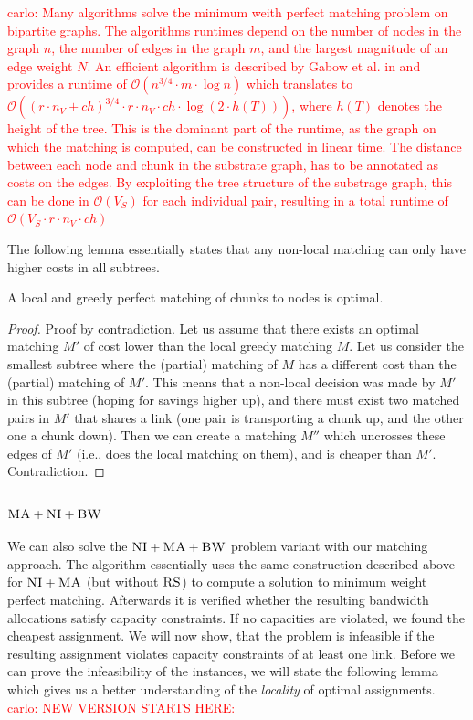 \documentclass[9pt]{sigcomm-alternate}
\newcommand{\carlo}[1]{\textcolor{red}{carlo: #1}}
\newcommand{\MaFactor}{r}
\newcommand{\SubstrateNodes}{\ensuremath{V_S}}
\newcommand{\CC}{\textsc{NI}}
\newcommand{\RS}{\textsc{RS}}
\newcommand{\BW}{\textsc{BW}}
\newcommand{\MA}{\textsc{MA}}
\newcommand{\Tree}{\ensuremath{T}}
\newcommand{\Vms}{\ensuremath{n_V}}
\newcommand{\ChunkTypes}{\ensuremath{ch}}
\begin{document}
\carlo{Many algorithms solve the minimum weith perfect matching problem on 
bipartite 
graphs. The algorithms runtimes depend on  the number of nodes in the 
graph $n$, the number of edges in the graph $m$, and the largest magnitude of 
an edge weight $N$. An efficient algorithm is described by Gabow et al. in 
\cite{gabow_scaling_algorithm} and provides a runtime of $\mathcal{O}(n^{3/4} 
\cdot m \cdot \log n)$ which translates to $\mathcal{O}((\MaFactor \cdot \Vms 
+ \ChunkTypes)^{3/4} \cdot  \MaFactor \cdot \Vms \cdot \ChunkTypes \cdot 
\log 
(2 \cdot h(\Tree)))$, where $h(T)$ denotes the height of the tree. This is the 
dominant part of the runtime, as the graph on which the matching 
is 
computed, can be constructed in linear time. The distance 
between each node and chunk in the substrate graph, has to be annotated as 
costs on the edges. 
By exploiting the tree structure of the substrage graph, this can be done 
in $\mathcal{O}(\SubstrateNodes)$ for each individual pair, resulting in a 
total runtime of $\mathcal{O}(\SubstrateNodes \cdot \MaFactor \cdot \Vms \cdot 
\ChunkTypes)$ }

The following lemma essentially states that any non-local matching can only have higher
costs in all subtrees. 
\begin{lemma}\label{lemma:local}
A local and greedy perfect matching of chunks to nodes is optimal.
\end{lemma}
\begin{proof}
Proof by contradiction. Let us assume that there exists an optimal matching $M'$ of cost lower
than the local greedy matching $M$. 
Let us consider the smallest subtree where the (partial) matching of $M$ 
has a different cost than the (partial) matching of $M'$. 
This means 
that a non-local decision was made by $M'$ in this subtree (hoping for savings higher up),
and there must exist two matched pairs in $M'$ that shares a link (one pair is transporting a chunk up, and
 the other one a chunk down). Then we can create a matching $M''$ 
 which uncrosses these edges of $M'$ (i.e., does the local matching on them),
  and is cheaper than $M'$. Contradiction.
\end{proof}




\subsubsection{$\MA+\CC+\BW$}

We can also solve the $\CC+\MA+\BW$ problem variant with our matching approach. 
The algorithm 
essentially uses
the same construction described above for $\CC+\MA$ (but without $\RS$) to 
compute a solution
to minimum weight perfect matching. Afterwards it is verified whether the
resulting bandwidth allocations satisfy capacity constraints. If
no capacities are violated, we found the cheapest assignment. We will
now show, that the problem is infeasible if the resulting assignment
violates capacity constraints of at least one link. 
Before we can prove the infeasibility of the instances, we will 
state the following lemma
which gives us a better understanding of the \emph{locality} of optimal 
assignments.
\carlo{NEW VERSION STARTS HERE:}
\end{document}
